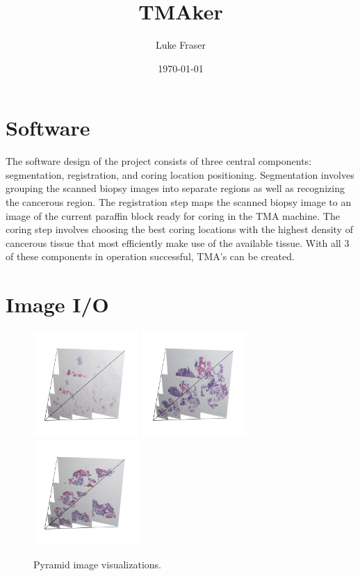 \documentclass[letterpaper,10pt,oneside]{article}
\author{Luke Fraser}
\title{TMAker}
\date{\today}
\begin{document}
\section{Software}
The software design of the project consists of three central components: segmentation, registration, and coring location positioning. Segmentation involves grouping the scanned biopsy images into separate regions as well as recognizing the cancerous region. The registration step maps the scanned biopsy image to an image of the current paraffin block ready for coring in the TMA machine. The coring step involves choosing the best coring locations with the highest density of cancerous tissue that most efficiently make use of the available tissue. With all 3 of these components in operation successful, TMA's can be created.

\section{Image I/O}

\begin{figure}[hbtp]
  \centering	
  \includegraphics[width=4cm]{visualization/Pyramid_PO13-00516A1_1_7_201305171148.png}
  \includegraphics[width=4cm]{visualization/Pyramid_PO13-01710A1_1_5_201312260943.png}
  \includegraphics[width=4cm]{visualization/Pyramid_PO14-00472B13_1_7_201404151132.png}
  \caption{Pyramid image visualizations.}
  \label{fig:pyramidimage}
\end{figure}
\end{document}
